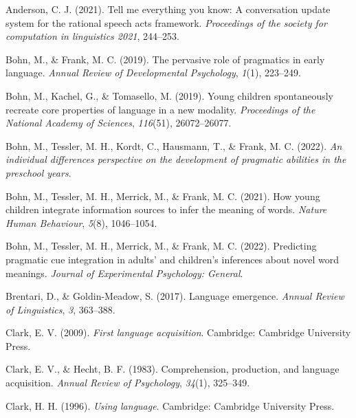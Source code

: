 \documentclass[
  man,floatsintext]{apa6}
\newlength{\cslhangindent}
\newlength{\cslentryspacingunit} %
\newenvironment{CSLReferences}[2] %
 {%
  \setlength{\parindent}{0pt}
  \ifodd #1
  \let\oldpar\par
  \def\par{\hangindent=\cslhangindent\oldpar}
  \fi
  \setlength{\parskip}{#2\cslentryspacingunit}
 }%
 {}
\begin{document}
\hypertarget{refs}{}
\begin{CSLReferences}{1}{0}
\leavevmode{}%
Anderson, C. J. (2021). Tell me everything you know: A conversation update system for the rational speech acts framework. \emph{Proceedings of the society for computation in linguistics 2021}, 244--253.

\leavevmode{}%
Bohn, M., \& Frank, M. C. (2019). The pervasive role of pragmatics in early language. \emph{Annual Review of Developmental Psychology}, \emph{1}(1), 223--249.

\leavevmode{}%
Bohn, M., Kachel, G., \& Tomasello, M. (2019). Young children spontaneously recreate core properties of language in a new modality. \emph{Proceedings of the National Academy of Sciences}, \emph{116}(51), 26072--26077.

\leavevmode{}%
Bohn, M., Tessler, M. H., Kordt, C., Hausmann, T., \& Frank, M. C. (2022). \emph{An individual differences perspective on the development of pragmatic abilities in the preschool years}.

\leavevmode{}%
Bohn, M., Tessler, M. H., Merrick, M., \& Frank, M. C. (2021). How young children integrate information sources to infer the meaning of words. \emph{Nature Human Behaviour}, \emph{5}(8), 1046--1054.

\leavevmode{}%
Bohn, M., Tessler, M. H., Merrick, M., \& Frank, M. C. (2022). Predicting pragmatic cue integration in adults' and children's inferences about novel word meanings. \emph{Journal of Experimental Psychology: General}.

\leavevmode{}%
Brentari, D., \& Goldin-Meadow, S. (2017). Language emergence. \emph{Annual Review of Linguistics}, \emph{3}, 363--388.

\leavevmode{}%
Clark, E. V. (2009). \emph{First language acquisition}. Cambridge: Cambridge University Press.

\leavevmode{}%
Clark, E. V., \& Hecht, B. F. (1983). Comprehension, production, and language acquisition. \emph{Annual Review of Psychology}, \emph{34}(1), 325--349.

\leavevmode{}%
Clark, H. H. (1996). \emph{Using language}. Cambridge: Cambridge University Press.


\end{CSLReferences}
\end{document}
